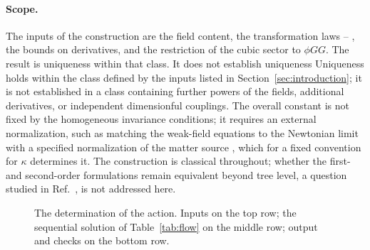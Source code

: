 \documentclass[prd,aps,preprint,superscriptaddress,nofootinbib,amsmath,amssymb,eqsecnum]{revtex4-2}
\newcommand{\W}{\mathcal{W}}
\providecommand{\DIFaddtex}[1]{{\protect\color{blue} \sf #1}} %
\providecommand{\DIFdeltex}[1]{{\protect\color{red} \scriptsize #1}} %
\providecommand{\DIFaddbegin}{} %
\providecommand{\DIFaddend}{} %
\providecommand{\DIFdelbegin}{} %
\providecommand{\DIFdelend}{} %
\providecommand{\DIFadd}[1]{\texorpdfstring{\DIFaddtex{#1}}{#1}} %
\providecommand{\DIFdel}[1]{\texorpdfstring{\DIFdeltex{#1}}{}} %
\begin{document}
\paragraph{Scope.} \DIFdelbegin \DIFdel{The inputs of the construction are the field content, the transformation
laws }%
\DIFdel{--}%
\DIFdel{, the bounds on derivatives, and the restriction of the
cubic sector to $\phi GG$. The result is uniqueness within that class. It does not establish
uniqueness }\DIFdelend \DIFaddbegin \DIFadd{Uniqueness holds within the class defined by the inputs listed in
Section~\ref{sec:introduction}; it is not established }\DIFaddend in a class containing further powers of
the fields, additional derivatives, or independent dimensionful couplings. The overall
constant is not fixed by the homogeneous invariance conditions; it requires an external
normalization, such as matching the weak-field equations to the Newtonian limit with a
specified normalization of the matter source\DIFdelbegin \DIFdel{, which for a fixed convention for $\kappa$ determines it}\DIFdelend . The construction is classical throughout;
whether the first- and second-order formulations remain equivalent beyond tree level, a
question studied in Ref.~\cite{BrandtMcKeon2016}, is not addressed here.

\begin{figure}[htb]
\centering
{}
\caption{The determination of the action. Inputs on the top row; the sequential solution of
Table~\ref{tab:flow} on the middle row; output and checks on the bottom row.}
\label{fig:flow}
\end{figure}
\end{document}
